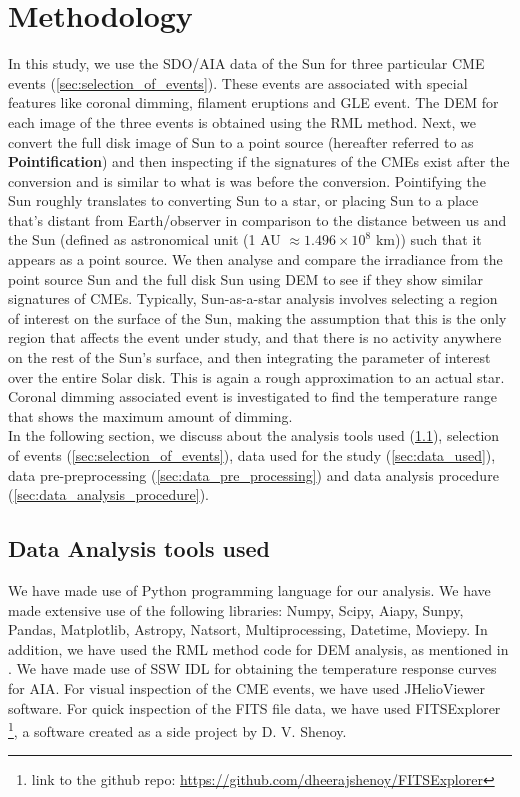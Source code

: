 \section{Methodology}

In this study, we use the SDO/AIA data of the Sun for three particular CME events (\cref{sec:selection_of_events}). These events are associated with special features like coronal dimming, filament eruptions and GLE event. The DEM for each image of the three events is obtained using the RML method. Next, we convert the full disk image of Sun to a point source (hereafter referred to as \textbf{Pointification}) and then inspecting if the signatures of the CMEs exist after the conversion and is similar to what is was before the conversion. Pointifying the Sun roughly translates to converting Sun to a star, or placing Sun to a place that's distant from Earth/observer in comparison to the distance between us and the Sun (defined as astronomical unit (1 AU $\approx 1.496\times10^{8}$ km)) such that it appears as a point source. We then analyse and compare the irradiance from the point source Sun and the full disk Sun using DEM to see if they show similar signatures of CMEs. Typically, Sun-as-a-star analysis involves selecting a region of interest on the surface of the Sun, making the assumption that this is the only region that affects the event under study, and that there is no activity anywhere on the rest of the Sun's surface, and then integrating the parameter of interest over the entire Solar disk. This is again a rough approximation to an actual star. Coronal dimming associated event is investigated to find the temperature range that shows the maximum amount of dimming.\\

In the following section, we discuss about the analysis tools used (\cref{sec:data_analysis_tools_used}), selection of events (\cref{sec:selection_of_events}), data used for the study (\cref{sec:data_used}), data pre-preprocessing (\cref{sec:data_pre_processing}) and data analysis procedure (\cref{sec:data_analysis_procedure}).

  \subsection{Data Analysis tools used}
  \label{sec:data_analysis_tools_used}

We have made use of Python programming language for our analysis. We have made extensive use of the following libraries: Numpy, Scipy, Aiapy, Sunpy, Pandas, Matplotlib, Astropy, Natsort, Multiprocessing, Datetime, Moviepy. In addition, we have used the RML method code for DEM analysis, as mentioned in \citep{Massa2023}. We have made use of SSW IDL for obtaining the temperature response curves for AIA. For visual inspection of the CME events, we have used JHelioViewer software. For quick inspection of the FITS file data, we have used FITSExplorer \footnote{link to the github repo: \url{https://github.com/dheerajshenoy/FITSExplorer}}, a software created as a side project by D. V. Shenoy.

